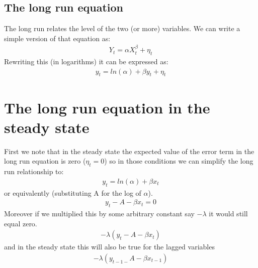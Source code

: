 \documentclass[letterpaper,10pt,english]{jupyterBook}
\begin{document}
\subsection{The long run equation}
\label{\detokenize{content/06_WBModels/LoadingWBModel:the-long-run-equation}}
\sphinxAtStartPar
The long run relates the level of the two (or more) variables.  We can write a simple version of that equation as:
\begin{equation*}
\begin{split} Y_t=αX_t^β+ \eta_t \end{split}
\end{equation*}
\sphinxAtStartPar
Rewriting this (in logarithms) it can be expressed as:
\begin{equation*}
\begin{split} y_t = ln⁡(α) + βy_t + \eta_t	\end{split}
\end{equation*}

\section{The long run equation in the steady state}
\label{\detokenize{content/06_WBModels/LoadingWBModel:the-long-run-equation-in-the-steady-state}}
\sphinxAtStartPar
First we note that in the steady state the expected value of the error term in the long run equation is zero (\(\eta_t=0 \)) so in those conditions we can simplify the long run relationship to:
\begin{equation*}
\begin{split}y_t=ln⁡(α)+\beta x_t\end{split}
\end{equation*}
\sphinxAtStartPar
or equivalently (substituting A for the log of \(\alpha\)).
\begin{equation*}
\begin{split}y_t-A-βx_t=0\end{split}
\end{equation*}
\sphinxAtStartPar
Moreover if we multiplied this by some arbitrary constant say \(-\lambda\) it would still equal zero.
\begin{equation*}
\begin{split}-\lambda(y_t -A-βx_t)\end{split}
\end{equation*}
\sphinxAtStartPar
and in the steady state this will also be true for the lagged variables
\begin{equation*}
\begin{split}-\lambda(y_{t-1-} A - βx_{t-1})\end{split}
\end{equation*}
\end{document}
